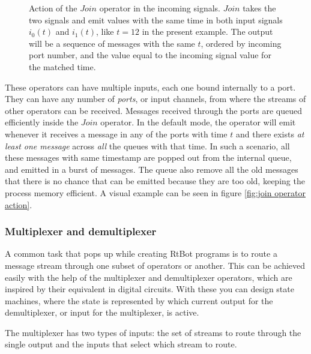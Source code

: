 \documentclass[preprint,1p,times]{elsarticle}
\begin{document}
\begin{figure}[ht]
\begin{center}
    \end{center}
    \caption{Action of the $Join$ operator in the incoming signals. $Join$ takes the two signals and emit 
    values with the same time in both input signals $i_0(t)$ and $i_1(t)$, like $t=12$ in the present example.
    The output will be a sequence of messages with the same $t$, ordered by incoming port number, and the value
    equal to the incoming signal value for the matched time.}
\end{figure}

These operators can have multiple inputs, each one bound internally to a port. They can have any number of \textit{ports}, 
or input channels, from where the streams of other operators can be received. Messages received through the ports 
are queued efficiently inside the $Join$ operator. In the default mode, the operator will emit whenever it receives 
a message in any of the ports with time $t$ and there exists \textit{at least one message} across \textit{all} the queues with that 
time. In such a scenario, all these messages with same timestamp are popped out from the internal queue, and emitted 
in a burst of messages. The queue also remove all the old messages that there is no chance that can be emitted
because they are too old, keeping the process memory efficient. A visual example can be seen in figure \ref{fig:join operator action}.

\subsubsection{Multiplexer and demultiplexer}
A common task that pops up while creating RtBot programs is to route a message stream through one subset of
operators or another.
This can be achieved easily with the help of the multiplexer and demultiplexer operators,
which are inspired by their equivalent in digital circuits. With these you can design state machines, where
the state is represented by which current output for the demultiplexer, or input for the multiplexer, is active.

The multiplexer has two types of inputs: the set of streams to route through the single output and the inputs
that select which stream to route.
\end{document}
